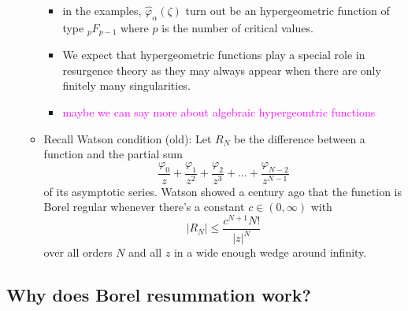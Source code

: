 \documentclass{article}
\begin{document}
\begin{itemize}
\begin{itemize}
\begin{itemize}
\item in the examples, $\hat{\varphi}_\alpha(\zeta)$ turn out be an hypergeometric function of type ${}_pF_{p-1}$ where $p$ is the number of critical values. 
\item We expect that hypergeometric functions play a special role in resurgence theory as they may always appear when there are only finitely many singularities.
\item \textcolor{magenta}{maybe we can say more about algebraic hypergeomtric functions}
\end{itemize}
\item Recall Watson condition (old): Let $R_N$ be the difference between a function and the partial sum
\[ \frac{\varphi_0}{z} + \frac{\varphi_1}{z^2} + \frac{\varphi_2}{z^3} + \ldots + \frac{\varphi_{N-2}}{z^{N-1}} \]
of its asymptotic series. Watson showed a century ago that the function is Borel regular whenever there's a constant $c \in (0, \infty)$ with
\[ |R_N| \le \frac{c^{N+1} N!}{|z|^N} \]
over all orders $N$ and all $z$ in a wide enough wedge around infinity.
\end{itemize}
\end{itemize}

\subsection{Why does Borel resummation work?}

\color{gray}
\end{document}

